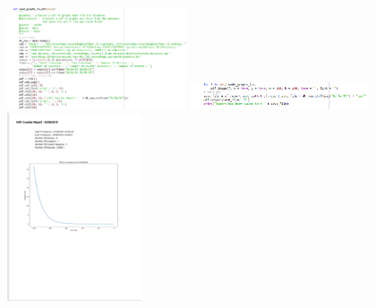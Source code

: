 \documentclass{report}
\begin{document}
\begin{figure}[h!]
    \centering
    \includegraphics[width=200]{sendToPDF1.PNG}
    \includegraphics[width=200]{sendToPDF2.PNG}
    \includegraphics[width=150]{handout1.PNG}

\end{figure}
\end{document}
